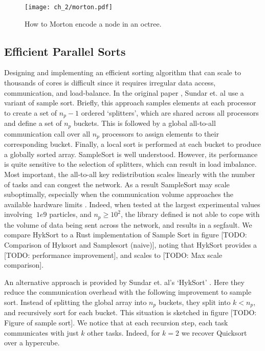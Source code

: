 \begin{figure}
    \centerline{\texttt{[image: ch\_2/morton.pdf]}}
    \caption{How to Morton encode a node in an octree.}
    \label{fig:sec_2_4:morton}
\end{figure}

\subsection*{Efficient Parallel Sorts}

Designing and implementing an efficient sorting algorithm that can scale to thousands of cores is difficult since it requires irregular data access, communication, and load-balance. In the original paper \cite{sundar2008bottom}, Sundar et. al use a variant of sample sort. Briefly, this approach samples elements at each processor to create a set of $n_p - 1 $ ordered `splitters', which are shared across all processors and define a set of $n_p$ buckets. This is followed by a global all-to-all communication call over all $n_p$ processors to assign elements to their corresponding bucket. Finally, a local sort is performed at each bucket to produce a globally sorted array. SampleSort is well understood. However, its performance is quite sensitive to the selection of splitters, which can result in load imbalance. Most important, the all-to-all key redistribution scales linearly with the number of tasks and can congest the network. As a result SampleSort may scale suboptimally, especially when the communication volume approaches the available hardware limits \cite{sundar2013hyksort}. Indeed, when tested at the largest experimental values involving $~1e9$ particles, and $n_p \geq 10^2$, the library defined  is not able to cope with the volume of data being sent across the network, and results in a segfault. We compare HykSort to a Rust implementation of Sample Sort in figure [TODO: Comparison of Hyksort and Samplesort (naive)], noting that HykSort provides a [TODO: performance improvement], and scales to [TODO: Max scale comparison].

An alternative approach is provided by Sundar et. al's `HykSort' \cite{sundar2013hyksort}. Here they reduce the communication overhead with the following improvement to sample sort. Instead of splitting the global array into $n_p$ buckets, they split into $k < n_p$, and recursively sort for each bucket. This situation is sketched in figure [TODO: Figure of sample sort]. We notice that at each recursion step, each task communicates with just $k$ other tasks. Indeed, for $k=2$ we recover Quicksort over a hypercube. 


